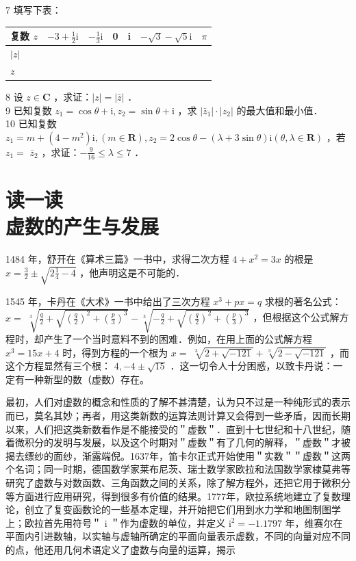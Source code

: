 \documentclass[10pt]{article}
\begin{document}
7 填写下表：

\begin{center}
\begin{tabular}{|l|l|l|l|l|l|l|}
\hline
复数 \(z\) & \(-3+\frac{1}{2} \mathrm{i}\) & \(-\frac{1}{3} \mathrm{i}\) & 0 & i & \(-\sqrt{3}-\sqrt{5} \mathrm{i}\) & \(\pi\) \\
\hline
\(|z|\) &  &  &  &  &  &  \\
\hline
\(z\) &  &  &  &  &  &  \\
\hline
\end{tabular}
\end{center}

8 设 \(z \in \mathbf{C}\) ，求证：\(|z|=|\bar{z}|\) ．\\
9 已知复数 \(z_{1}=\cos \theta+\mathrm{i}, z_{2}=\sin \theta+\mathrm{i}\) ，求 \(\left|\bar{z}_{1}\right| \cdot\left|z_{2}\right|\) 的最大值和最小值．\\
10 已知复数 \(z_{1}=m+\left(4-m^{2}\right) \mathrm{i},(m \in \mathbf{R}), z_{2}=2 \cos \theta-(\lambda+3 \sin \theta) \mathrm{i}(\theta, \lambda \in \mathbf{R})\) ，若 \(z_{1}=\) \(\bar{z}_{2}\) ，求证：\(-\frac{9}{16} \leqslant \lambda \leqslant 7\) ．

\section*{读一读 \\
 虚数的产生与发展}
1484 年，舒开在《算术三篇》一书中，求得二次方程 \(4+x^{2}=3 x\) 的根是 \(x=\frac{3}{2} \pm \sqrt{2 \frac{1}{4}-4}\) ，他声明这是不可能的．

1545 年，卡丹在《大术》一书中给出了三次方程 \(x^{3}+p x=q\) 求根的著名公式：\(x=\) \(\sqrt[3]{\frac{q}{2}+\sqrt{\left(\frac{q}{2}\right)^{2}+\left(\frac{p}{3}\right)^{3}}}-\sqrt[3]{-\frac{q}{2}+\sqrt{\left(\frac{q}{2}\right)^{2}+\left(\frac{p}{3}\right)^{3}}}\) ，但根据这个公式解方程时，却产生了一个当时意料不到的困难．例如，在用上面的公式解方程 \(x^{3}=15 x+4\) 时，得到方程的一个根为 \(x=\) \(\sqrt[3]{2+\sqrt{-121}}+\sqrt[3]{2-\sqrt{-121}}\) ，而这个方程显然有三个根： \(4,-4 \pm \sqrt{15}\) ．这一切令人十分困惑，以致卡丹说：一定有一种新型的数（虚数）存在。

最初，人们对虚数的概念和性质的了解不甚清楚，认为只不过是一种纯形式的表示而已，莫名其妙；再者，用这类新数的运算法则计算又会得到一些矛盾，因而长期以来，人们把这类新数看作是不能接受的＂虚数＂．直到十七世纪和十八世纪，随着微积分的发明与发展，以及这个时期对＂虚数＂有了几何的解释，＂虚数＂才被揭去缥纱的面纱，渐露端倪。1637年，笛卡尔正式开始使用＂实数＂＂虚数＂这两个名词；同一时期，德国数学家莱布尼茨、瑞士数学家欧拉和法国数学家棣莫弗等研究了虚数与对数函数、三角函数之间的关系，除了解方程外，还把它用于微积分等方面进行应用研究，得到很多有价值的结果。1777年，欧拉系统地建立了复数理论，创立了复变函数论的一些基本定理，并开始把它们用到水力学和地图制图学上；欧拉首先用符号＂ i ＂作为虚数的单位，并定义 \(\mathrm{i}^{2}=-1.1797\) 年，维赛尔在平面内引进数轴，以实轴与虚轴所确定的平面向量表示虚数，不同的向量对应不同的点，他还用几何术语定义了虚数与向量的运算，揭示
\end{document}
